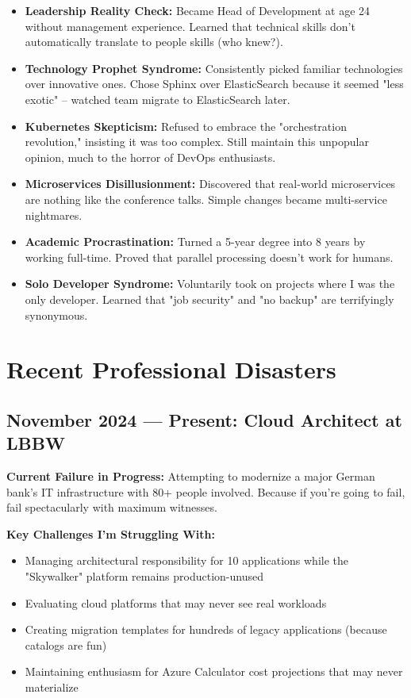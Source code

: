 \documentclass[10pt,a4paper]{article}
\begin{document}
\begin{itemize}[leftmargin=1em, itemsep=0.3em]
\item \textbf{Leadership Reality Check:} Became Head of Development at age 24 without management experience. Learned that technical skills don't automatically translate to people skills (who knew?).
\item \textbf{Technology Prophet Syndrome:} Consistently picked familiar technologies over innovative ones. Chose Sphinx over ElasticSearch because it seemed "less exotic" – watched team migrate to ElasticSearch later.
\item \textbf{Kubernetes Skepticism:} Refused to embrace the "orchestration revolution," insisting it was too complex. Still maintain this unpopular opinion, much to the horror of DevOps enthusiasts.
\item \textbf{Microservices Disillusionment:} Discovered that real-world microservices are nothing like the conference talks. Simple changes became multi-service nightmares.
\item \textbf{Academic Procrastination:} Turned a 5-year degree into 8 years by working full-time. Proved that parallel processing doesn't work for humans.
\item \textbf{Solo Developer Syndrome:} Voluntarily took on projects where I was the only developer. Learned that "job security" and "no backup" are terrifyingly synonymous.
\end{itemize}

\section{Recent Professional Disasters}

\subsection{November 2024 — Present: Cloud Architect at LBBW}
\textbf{Current Failure in Progress:} Attempting to modernize a major German bank's IT infrastructure with 80+ people involved. Because if you're going to fail, fail spectacularly with maximum witnesses.

\textbf{Key Challenges I'm Struggling With:}
\begin{itemize}[leftmargin=1em, itemsep=0.2em]
\item Managing architectural responsibility for 10 applications while the "Skywalker" platform remains production-unused
\item Evaluating cloud platforms that may never see real workloads
\item Creating migration templates for hundreds of legacy applications (because catalogs are fun)
\item Maintaining enthusiasm for Azure Calculator cost projections that may never materialize
\end{itemize}
\end{document}
